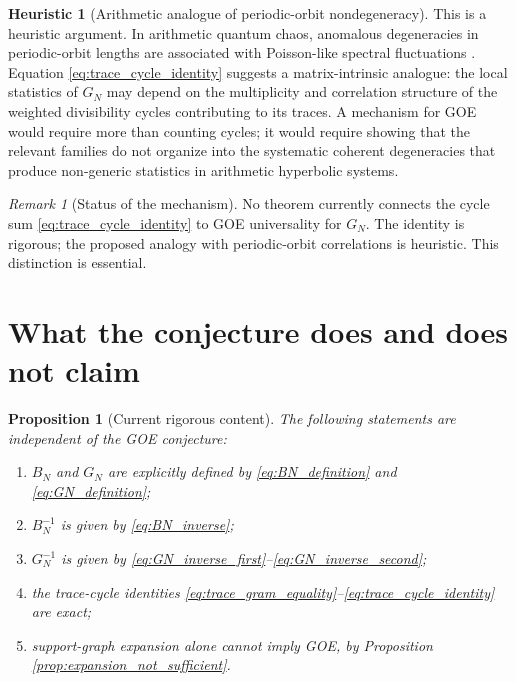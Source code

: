\documentclass[11pt]{amsart}
\numberwithin{equation}{section}
\theoremstyle{plain}
\newtheorem{proposition}[theorem]{Proposition}
\theoremstyle{definition}
\newtheorem{heuristic}[theorem]{Heuristic}
\theoremstyle{remark}
\newtheorem{remark}[theorem]{Remark}
\begin{document}
\begin{heuristic}[Arithmetic analogue of periodic-orbit nondegeneracy]
\label{heur:cycle_nondegeneracy}
This is a heuristic argument.  In arithmetic quantum chaos, anomalous degeneracies in periodic-orbit lengths are associated with Poisson-like spectral fluctuations \cite{BogomolnyEtAl1992,LuoSarnak1994}.  Equation \eqref{eq:trace_cycle_identity} suggests a matrix-intrinsic analogue: the local statistics of $G_N$ may depend on the multiplicity and correlation structure of the weighted divisibility cycles contributing to its traces.  A mechanism for GOE would require more than counting cycles; it would require showing that the relevant families do not organize into the systematic coherent degeneracies that produce non-generic statistics in arithmetic hyperbolic systems.
\end{heuristic}

\begin{remark}[Status of the mechanism]
\label{rem:cycle_mechanism_status}
No theorem currently connects the cycle sum \eqref{eq:trace_cycle_identity} to GOE universality for $G_N$.  The identity is rigorous; the proposed analogy with periodic-orbit correlations is heuristic.  This distinction is essential.
\end{remark}

\section{What the conjecture does and does not claim}
\label{sec:scope}

\begin{proposition}[Current rigorous content]
\label{prop:current_rigorous_content}
The following statements are independent of the GOE conjecture:
\begin{enumerate}[label=(\roman*)]
\item $B_N$ and $G_N$ are explicitly defined by \eqref{eq:BN_definition} and \eqref{eq:GN_definition};
\item $B_N^{-1}$ is given by \eqref{eq:BN_inverse};
\item $G_N^{-1}$ is given by \eqref{eq:GN_inverse_first}--\eqref{eq:GN_inverse_second};
\item the trace-cycle identities \eqref{eq:trace_gram_equality}--\eqref{eq:trace_cycle_identity} are exact;
\item support-graph expansion alone cannot imply GOE, by Proposition \ref{prop:expansion_not_sufficient}.
\end{enumerate}
\end{proposition}
\end{document}
